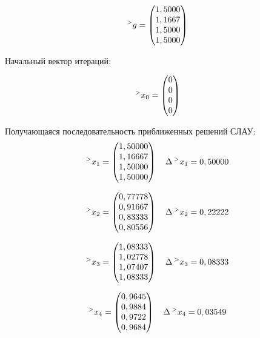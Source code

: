 \documentclass[14pt,a4paper]{scrartcl}
\begin{document}
$$
\prescript{>}{}{g} = 
\begin{pmatrix}
1,5000 \\
1,1667 \\
1,5000 \\
1,5000
\end{pmatrix}
$$

Начальный вектор итераций:

$$
\prescript{>}{}{x_0} = 
\begin{pmatrix}
0 \\
0 \\
0 \\
0
\end{pmatrix}
$$

Получающаяся последовательность приближенных решений СЛАУ:
\begin{equation*}
\prescript{>}{}{x_1} = 
\begin{pmatrix}
1,50000 \\
1,16667 \\
1,50000 \\
1,50000
\end{pmatrix}
\quad
\Delta\prescript{>}{}{x_1} = 0,50000
\end{equation*}

\begin{equation*}
\prescript{>}{}{x_2} = 
\begin{pmatrix}
0,77778 \\
0,91667 \\
0,83333 \\
0,80556
\end{pmatrix}
\quad
\Delta\prescript{>}{}{x_2} = 0,22222
\end{equation*}

\begin{equation*}
\prescript{>}{}{x_3} = 
\begin{pmatrix}
1,08333 \\
1,02778 \\
1,07407 \\
1,08333
\end{pmatrix}
\quad
\Delta\prescript{>}{}{x_3} = 0,08333
\end{equation*}

\begin{equation*}
\prescript{>}{}{x_4} = 
\begin{pmatrix}
0,9645\\
0,9884\\
0,9722\\
0,9684
\end{pmatrix}
\quad
\Delta\prescript{>}{}{x_4} = 0,03549
\end{equation*}
\end{document}
